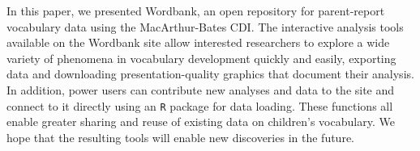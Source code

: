 \documentclass[doc,noapacite]{apa2}
\newcommand{\comment}[1]{\marginpar[]{\small \textcolor{blue}{#1}}}
\begin{document}
In this paper, we presented Wordbank, an open repository for parent-report vocabulary data using the MacArthur-Bates CDI. The interactive analysis tools available on the Wordbank site allow interested researchers to explore a wide variety of phenomena in vocabulary development quickly and easily, exporting data and downloading presentation-quality graphics that document their analysis. In addition, power users can contribute new analyses and data to the site and connect to it directly using an \texttt{R} package for data loading. These functions all enable greater sharing and reuse of existing data on children's vocabulary. We hope that the resulting tools will enable new discoveries in the future.\comment{Further discussion of limitations or extensions?}



\end{document}
